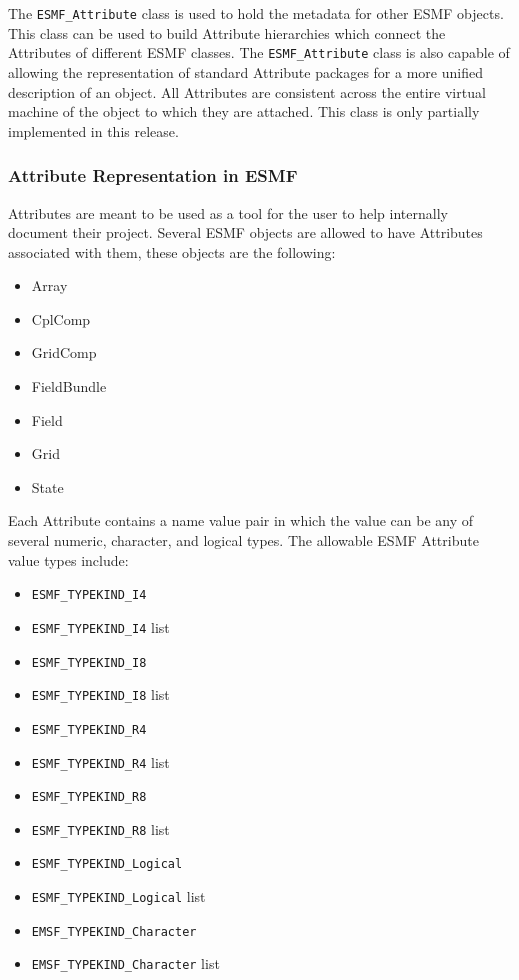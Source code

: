 %

The {\tt ESMF\_Attribute} class is used to hold the metadata for other ESMF objects.  This class can be used to build Attribute hierarchies which connect the Attributes of different ESMF classes.  The {\tt ESMF\_Attribute} class is also capable of allowing the representation of standard Attribute packages for a more unified description of an object.  All Attributes are consistent across the entire virtual machine of the object to which they are attached.  This class is only partially implemented in this release.

\subsubsection{Attribute Representation in ESMF}

Attributes are meant to be used as a tool for the user to help internally document their project.   Several ESMF objects are allowed to have Attributes associated with them, these objects are the following:

\begin{itemize}
\item Array
\item CplComp
\item GridComp
\item FieldBundle
\item Field
\item Grid
\item State
\end{itemize}

Each Attribute contains a name value pair in which the value can be any of several numeric, character, and logical types.  The allowable ESMF Attribute value types include:

\begin{itemize}
\item {\tt ESMF\_TYPEKIND\_I4}
\item {\tt ESMF\_TYPEKIND\_I4} list
\item {\tt ESMF\_TYPEKIND\_I8}
\item {\tt ESMF\_TYPEKIND\_I8} list
\item {\tt ESMF\_TYPEKIND\_R4}
\item {\tt ESMF\_TYPEKIND\_R4} list
\item {\tt ESMF\_TYPEKIND\_R8}
\item {\tt ESMF\_TYPEKIND\_R8} list
\item {\tt ESMF\_TYPEKIND\_Logical}
\item {\tt ESMF\_TYPEKIND\_Logical} list
\item {\tt EMSF\_TYPEKIND\_Character}
\item {\tt EMSF\_TYPEKIND\_Character} list
\end{itemize}

